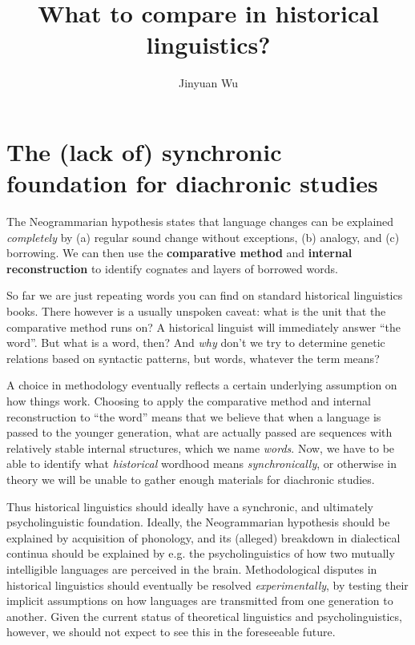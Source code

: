 \documentclass[a4paper, oneside, scheme=plain, 12pt]{article}
\title{What to compare in historical linguistics?}
\author{Jinyuan Wu}
\newcommand*{\concept}[1]{\textbf{#1}}
\newcommand*{\term}[1]{\emph{#1}}
\begin{document}
\automath

\maketitle

\section{The (lack of) synchronic foundation for diachronic studies}

The Neogrammarian hypothesis states that language changes can be explained \emph{completely} by 
(a) regular sound change without exceptions,
(b) analogy, and (c) borrowing.
We can then use the \concept{comparative method} and \concept{internal reconstruction}
to identify cognates and layers of borrowed words.

So far we are just repeating words you can find on standard historical linguistics books.
There however is a usually unspoken caveat:
what is the unit that the comparative method runs on?
A historical linguist will immediately answer ``the word''.
But what is a word, then? And \emph{why} don't we try to determine genetic relations based on syntactic patterns, but words, whatever the term means?

A choice in methodology eventually reflects a certain underlying assumption on how things work.
Choosing to apply the comparative method and internal reconstruction to ``the word''
means that we believe that when a language is passed to the younger generation,
what are actually passed are sequences with relatively stable internal structures,
which we name \term{words}.
Now, we have to be able to identify what \emph{historical} wordhood means \emph{synchronically},
or otherwise in theory we will be unable to gather enough materials for diachronic studies.

Thus historical linguistics should ideally have a synchronic, and ultimately psycholinguistic foundation.
Ideally, the Neogrammarian hypothesis should be explained by acquisition of phonology,
and its (alleged) breakdown in dialectical continua should be explained by
e.g. the psycholinguistics of how two mutually intelligible languages are perceived in the brain.
Methodological disputes in historical linguistics should eventually be resolved \emph{experimentally},
by testing their implicit assumptions on how languages are transmitted from one generation to another.
Given the current status of theoretical linguistics and psycholinguistics,
however, we should not expect to see this in the foreseeable future.
\end{document}

